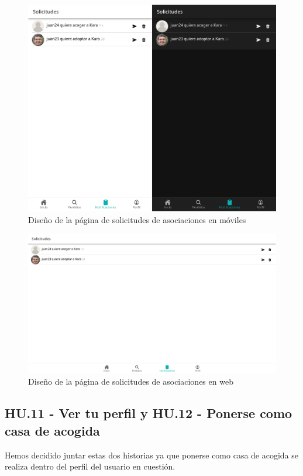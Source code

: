 \begin{figure} [H]
	\centering
	\includegraphics[width=1\linewidth]{sprint 3//hu9-10/solicitudes.png}
	\caption{Diseño de la página de solicitudes de asociaciones en móviles}
	\label{fig:notificaciones}
\end{figure}

\begin{figure}[H]
	\centering
	\includegraphics[width=0.8\linewidth]{sprint 3//hu9-10/solicitudesWeb.png}
	\caption{Diseño de la página de solicitudes de asociaciones en web}
\end{figure}

\subsection{HU.11 - Ver tu perfil y HU.12 - Ponerse como casa de acogida}

Hemos decidido juntar estas dos historias ya que ponerse como casa de acogida se realiza dentro del perfil del usuario en cuestión.

